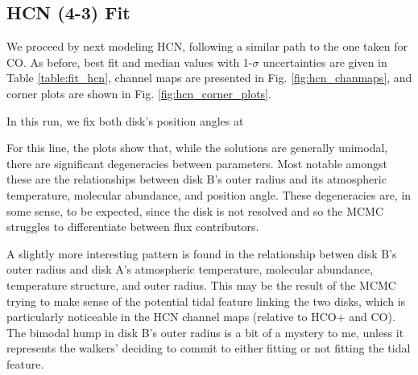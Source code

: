 \subsection{HCN (4-3) Fit}

We proceed by next modeling HCN, following a similar path to the one taken for CO. As before, best fit and median values with 1-$\sigma$  uncertainties are given in Table \ref{table:fit_hcn}, channel maps are presented in Fig. \ref{fig:hcn_chanmaps}, and corner plots are shown in Fig. \ref{fig:hcn_corner_plots}.

In this run, we fix both disk's position angles at %

For this line, the plots show that, while the solutions are generally unimodal, there are significant degeneracies between parameters. Most notable amongst these are the relationships between disk B's outer radius and its atmospheric temperature, molecular abundance, and position angle. These degeneracies are, in some sense, to be expected, since the disk is not resolved and so the MCMC struggles to differentiate between flux contributors.

A slightly more interesting pattern is found in the relationship betwen disk B's outer radius and disk A's atmospheric temperature, molecular abundance, temperature structure, and outer radius. This may be the result of the MCMC trying to make sense of the potential tidal feature linking the two disks, which is particularly noticeable in the HCN channel maps (relative to HCO+ and CO). The bimodal hump in disk B's outer radius is a bit of a mystery to me, unless it represents the walkers' deciding to commit to either fitting or not fitting the tidal feature.



